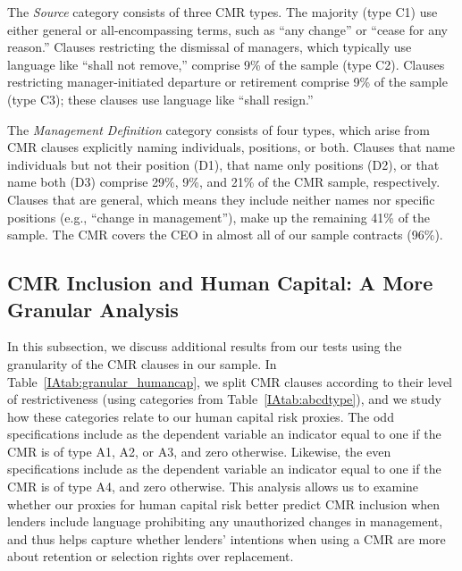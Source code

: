 \documentclass[12pt]{article}
\begin{document}
\begin{appendices}
The \textit{Source} category consists of three CMR types.
The majority (type C1) use either general or all-encompassing terms, such as ``any change'' or ``cease for any reason.''
Clauses restricting the dismissal of managers, which typically use language like ``shall not remove,'' comprise 9\% of the sample (type C2).
Clauses restricting manager-initiated departure or retirement comprise 9\% of the sample (type C3); these clauses use language like ``shall resign.''


The \textit{Management Definition} category consists of four types, which arise from CMR clauses explicitly naming individuals, positions, or both.
Clauses that name individuals but not their position (D1), that name only positions (D2), or that name both (D3) comprise 29\%, 9\%, and 21\% of the CMR sample, respectively.
Clauses that are general, which means they include neither names nor specific positions (e.g., ``change in management''), make up the remaining 41\% of the sample.
The CMR covers the CEO in almost all of our sample contracts (96\%).



\subsection{CMR Inclusion and Human Capital: A More Granular Analysis}
In this subsection, we discuss additional results from our tests using the granularity of the CMR clauses in our sample.
In Table~\ref{IAtab:granular_humancap}, we split CMR clauses according to their level of restrictiveness (using categories from Table~\ref{IAtab:abcdtype}), and we study how these categories relate to our human capital risk proxies.
The odd specifications include as the dependent variable an indicator equal to one if the CMR is of type A1, A2, or A3, and zero otherwise.
Likewise, the even specifications include as the dependent variable an indicator equal to one if the CMR is of type A4, and zero otherwise.
This analysis allows us to examine whether our proxies for human capital risk better predict CMR inclusion when lenders include language prohibiting any unauthorized changes in management, and thus helps capture whether lenders' intentions when using a CMR are more about retention or selection rights over replacement.



\end{appendices}
\end{document}
